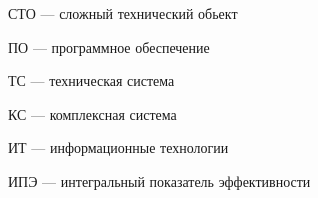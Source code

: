 
\hypertarget{sto}{СТО --- сложный технический обьект}

\hypertarget{soft}{ПО --- программное обеспечение}















\hypertarget{it}{ТС --- техническая система}

\hypertarget{it}{КС --- комплексная система}

\hypertarget{it}{ИТ --- информационные технологии}

\hypertarget{it}{ИПЭ --- интегральный показатель эффективности}




